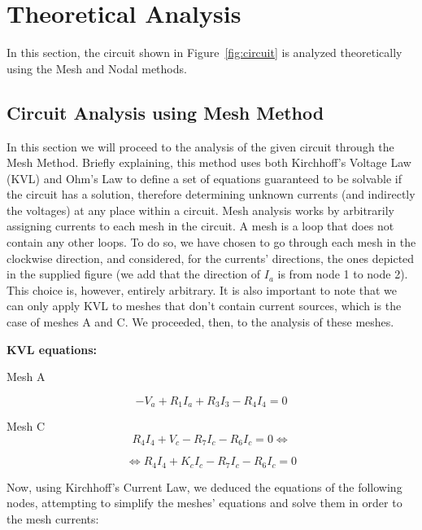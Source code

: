 \newpage
\section{Theoretical Analysis}
\label{sec:analysis}

In this section, the circuit shown in Figure~\ref{fig:circuit} is analyzed
theoretically using the Mesh and Nodal methods. 

\subsection{Circuit Analysis using Mesh Method}
\label{sec:mesh}
In this section we will proceed to the analysis of the given circuit through the Mesh Method.
Briefly explaining, this method uses both Kirchhoff’s Voltage Law (KVL) and Ohm’s Law to define a set of equations guaranteed to be solvable if the circuit has a solution, therefore determining unknown currents (and indirectly the voltages) at any place within a circuit.
Mesh analysis works by arbitrarily assigning currents to each mesh in the circuit. A mesh is a loop that does not contain any other loops.
To do so, we have chosen to go through each mesh in the clockwise direction, and considered, for the currents' directions, the ones depicted in the supplied figure (we add that the direction of $I_a$ is from node 1 to node 2). This choice is, however, entirely arbitrary. It is also important to note that we can only apply KVL to meshes that don't contain current sources, which is the case of meshes A and C. We proceeded, then, to the analysis of these meshes.
\par
\medskip

\textbf{KVL equations:}

Mesh A

\begin{equation}
	-V_a + R_1I_a + R_3I_3 - R_4I_4 = 0
	\label{eq:kvl}
\end{equation}


Mesh C
\begin{equation}
	R_4I_4 + V_c - R_7I_c - R_6I_c = 0\Leftrightarrow
	\label{eq:kvl1}
\end{equation}

\begin{equation}
	\Leftrightarrow R_4I_4 + K_cI_c - R_7I_c - R_6I_c = 0
	\label{eq:kvl1}
\end{equation}

Now, using Kirchhoff's Current Law, we deduced the equations of the following nodes, attempting to simplify the meshes' equations and solve them in order to the mesh currents:
\par
\medskip

